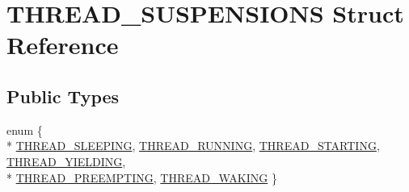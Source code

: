 \hypertarget{struct_t_h_r_e_a_d___s_u_s_p_e_n_s_i_o_n_s}{\section{T\-H\-R\-E\-A\-D\-\_\-\-S\-U\-S\-P\-E\-N\-S\-I\-O\-N\-S Struct Reference}
\label{struct_t_h_r_e_a_d___s_u_s_p_e_n_s_i_o_n_s}
}
\subsection*{Public Types}
\begin{DoxyCompactItemize}
\item 
enum \{ \\*
\hyperlink{struct_t_h_r_e_a_d___s_u_s_p_e_n_s_i_o_n_s_ae6e5dd8db50db603c38992bec6c3b140a9d208fd699dc082d0bcf87c11dad0305}{T\-H\-R\-E\-A\-D\-\_\-\-S\-L\-E\-E\-P\-I\-N\-G}, 
\hyperlink{struct_t_h_r_e_a_d___s_u_s_p_e_n_s_i_o_n_s_ae6e5dd8db50db603c38992bec6c3b140a53893f2e6771383a49e40987b3969deb}{T\-H\-R\-E\-A\-D\-\_\-\-R\-U\-N\-N\-I\-N\-G}, 
\hyperlink{struct_t_h_r_e_a_d___s_u_s_p_e_n_s_i_o_n_s_ae6e5dd8db50db603c38992bec6c3b140af629e9cc8d098b4b5d38f8dd2dfc77a3}{T\-H\-R\-E\-A\-D\-\_\-\-S\-T\-A\-R\-T\-I\-N\-G}, 
\hyperlink{struct_t_h_r_e_a_d___s_u_s_p_e_n_s_i_o_n_s_ae6e5dd8db50db603c38992bec6c3b140ac82217acb61d51af97d1e69a951a1898}{T\-H\-R\-E\-A\-D\-\_\-\-Y\-I\-E\-L\-D\-I\-N\-G}, 
\\*
\hyperlink{struct_t_h_r_e_a_d___s_u_s_p_e_n_s_i_o_n_s_ae6e5dd8db50db603c38992bec6c3b140a12a672e40fe739c43eb40194675a2373}{T\-H\-R\-E\-A\-D\-\_\-\-P\-R\-E\-E\-M\-P\-T\-I\-N\-G}, 
\hyperlink{struct_t_h_r_e_a_d___s_u_s_p_e_n_s_i_o_n_s_ae6e5dd8db50db603c38992bec6c3b140a5da5174d79f4403982f1d800a6e67c5c}{T\-H\-R\-E\-A\-D\-\_\-\-W\-A\-K\-I\-N\-G}
 \}
\end{DoxyCompactItemize}
